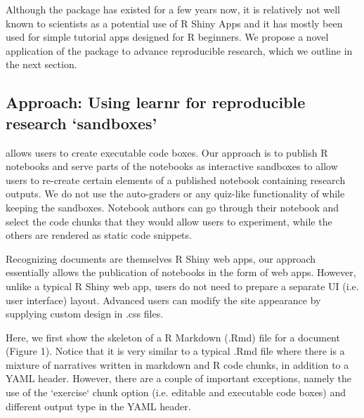 Although the  package has existed for a few years now,
it is relatively not well known to scientists as a potential use of R
Shiny Apps and it has mostly been used for simple tutorial apps designed
for R beginners. We propose a novel application of the 
package to advance reproducible research, which we outline in the next
section.

\hypertarget{approach-using-learnr-for-reproducible-research-sandboxes}{%
\subsection{\texorpdfstring{Approach: Using learnr for
reproducible research
`sandboxes'}{Approach: Using learnr for reproducible research `sandboxes'}}\label{approach-using-learnr-for-reproducible-research-sandboxes}}

 allows users to create executable code boxes. Our
approach is to publish R notebooks and serve parts of the notebooks as
interactive sandboxes to allow users to re-create certain elements of a
published notebook containing research outputs. We do not use the
auto-graders or any quiz-like functionality of  while
keeping the sandboxes. Notebook authors can go through their notebook
and select the code chunks that they would allow users to experiment,
while the others are rendered as static code snippets.

Recognizing  documents are themselves R Shiny web apps,
our approach essentially allows the publication of notebooks in the form
of web apps. However, unlike a typical R Shiny web app, users do not
need to prepare a separate UI (i.e. user interface) layout. Advanced
users can modify the site appearance by supplying custom design in .css
files.

Here, we first show the skeleton of a R Markdown (.Rmd) file for a
 document (Figure 1). Notice that it is very similar to
a typical .Rmd file where there is a mixture of narratives written in
markdown and R code chunks, in addition to a YAML header. However,
there are a couple of important exceptions, namely the use of the
`exercise` chunk option (i.e. editable and executable code boxes)
and different output type in the YAML header.

